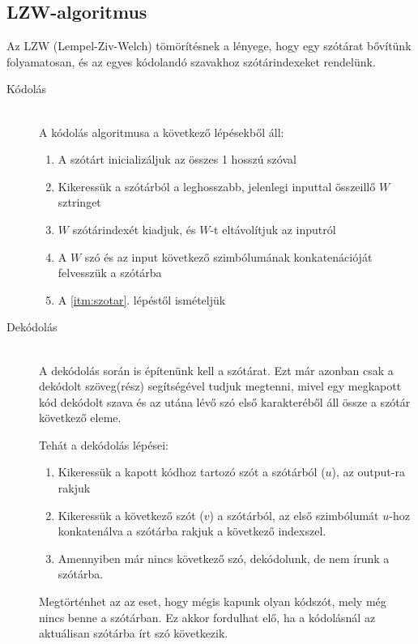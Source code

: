 \documentclass[margin=0px]{article}
\begin{document}
		\subsection{LZW-algoritmus}
			Az LZW (Lempel-Ziv-Welch) tömörítésnek a lényege, hogy egy szótárat bővítünk folyamatosan, és az egyes kódolandó szavakhoz szótárindexeket rendelünk.
			\begin{description}
				\item[Kódolás] \hfill \\
					A kódolás algoritmusa a következő lépésekből áll:
					 \begin{enumerate}
					 	\item A szótárt inicializáljuk az összes 1 hosszú szóval
					 	\item \label{itm:szotar} Kikeressük a szótárból a leghosszabb, jelenlegi inputtal összeillő $W$ sztringet
					 	\item $W$ szótárindexét kiadjuk, és $W$-t eltávolítjuk az inputról
					 	\item A $W$ szó és az input következő szimbólumának konkatenációját felvesszük a szótárba
					 	\item A \ref{itm:szotar}. lépéstől ismételjük
					 \end{enumerate}
				\item[Dekódolás] \hfill \\
					A dekódolás során is építenünk kell a szótárat. Ezt már azonban csak a dekódolt szöveg(rész) segítségével tudjuk megtenni, mivel egy megkapott kód dekódolt szava és az utána lévő szó első karakteréből áll össze a szótár következő eleme. 
					
					Tehát a dekódolás lépései:
					\begin{enumerate}
					\item Kikeressük a kapott kódhoz tartozó szót a szótárból ($u$), az output-ra rakjuk
					\item Kikeressük a következő szót ($v$) a szótárból, az első szimbólumát $u$-hoz konkatenálva a szótárba rakjuk a következő indexszel.
					\item Amennyiben már nincs következő szó, dekódolunk, de nem írunk a szótárba.
					\end{enumerate}
					
					Megtörténhet az az eset, hogy mégis kapunk olyan kódszót, mely még nincs benne a szótárban. Ez akkor fordulhat elő, ha a kódolásnál az aktuálisan szótárba írt szó következik.\\
					

\end{description}
\end{document}
